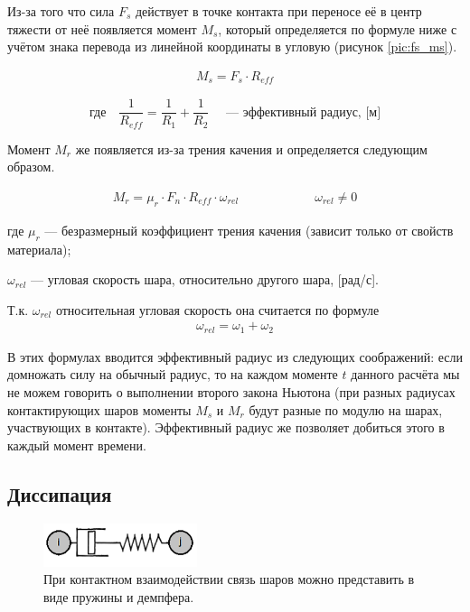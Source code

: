 \documentclass[a4paper]{article}
\begin{document}
Из-за того что сила $F_s$ действует в точке контакта при переносе её в центр тяжести от неё появляется момент $M_s$, который определяется по формуле ниже с учётом знака перевода из линейной координаты в угловую (рисунок \ref{pic:fs_ms}).

\begin{align}
\label{sliding_moment}
M_s = F_s \cdot R_{eff}
\end{align}

\[
\text{где} \quad \dfrac{1}{R_{eff}} = \dfrac{1}{R_1} + \dfrac{1}{R_2} \quad \text{ --- эффективный радиус, [м]}
\]

Момент $M_r$ же появляется из-за трения качения и определяется следующим образом.

\begin{align}
\label{rolling_moment}
M_r = \mu_r \cdot F_n \cdot R_{eff} \cdot \omega_{rel} \qquad \qquad \qquad \omega_{rel} \neq 0
\end{align}

где $\mu_r$ --- безразмерный коэффициент трения качения (зависит только от свойств материала);

$\omega_{rel}$ --- угловая скорость шара, относительно другого шара, [рад/с].

Т.к. $\omega_{rel}$ относительная угловая скорость она считается по формуле 
\begin{align*}
\omega_{rel} = \omega_1 + \omega_2
\end{align*}

В этих формулах вводится эффективный радиус из следующих соображений: если домножать силу на обычный радиус, то на каждом моменте $t$ данного расчёта мы не можем говорить о выполнении второго закона Ньютона (при разных радиусах контактирующих шаров моменты $M_s$ и $M_r$ будут разные по модулю на шарах, участвующих в контакте).
Эффективный радиус же позволяет добиться этого в каждый момент времени.


\subsection{Диссипация}
\label{dempf_subsection}

\begin{figure}[h!]
	\centering
	\includegraphics[width=0.4\textwidth]{dempf}
	\caption{При контактном взаимодействии связь шаров можно представить в виде пружины и демпфера.}
	\label{pic:dempf}
\end{figure} 
\end{document}
